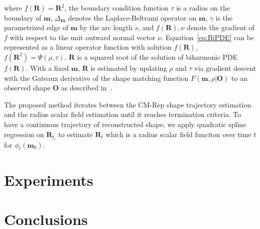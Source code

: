\documentclass[runningheads,a4paper]{llncs}
\begin{document}
where $f(\mathbf{R}) = \mathbf{R}^2$, the boundary condition function $\tau$ is a radius on the boundary of $\mathbf{m}$, $\Delta_{\mathbf{m}}$ denotes the Laplace-Beltrami operator on $\mathbf{m}$, $\gamma$ is the parametrized edge of $\mathbf{m}$ by the arc length $s$, and $f(\mathbf{R}), \nu$ denots the gradient of $f$ with respect to the unit outward normal vector $\nu$. 
Equation~\ref{eq:BiPDE} can be represented as a linear operator function with solution $f(\mathbf{R})$, $f(\mathbf{R}^2) = \Psi( \rho, \tau)$.
$\mathbf{R}$ is a squared root of the solution of biharmonic PDE $f(\mathbf{R})$. 
With a fixed $\mathbf{m}$, $\mathbf{R}$ is estimated by updating $\rho$ and $\tau$ via gradient descent with the Gateaux derivative of the shape matching function $F( \mathbf{m}, \rho | \mathbf{O})$ to an observed shape $\mathbf{O}$ as described in~\cite{Yushkevich2006}.

The proposed method iterates between the CM-Rep shape trajectory estimation and the radius scalar field estimation until it reaches termination criteria. 
To have a continuous trajectory of reconstructed shape, we apply quadratic spline regression on $\mathbf{R}_{t_i}$ to estimate $\mathbf{R}_t$ which is a radius scalar field funciton over time $t$ for $\phi_t(\mathbf{m}_0)$. 

\section{Experiments}

\section{Conclusions}

\begin{comment}
In this study, we proposed a novel framework that makes use of subject-specific shape deformation trajectories by diffeomorphic shape regression models and the longitudinal statistical analysis.
Results show how the shape deformation has more significance than the volumetric analysis and how significantly it correlates with continuous CAP score for a global shape and local subregions. 
The global shape analysis showed that the gradient magnitude of deformation vectors over global shape has better significance than volume-wise metric regardless of different baseline shapes of different subjects.
The local shape analysis also revealed statistically significant general trends of subregion shape changes. 
As a future direction, the analysis will also be extended to develop an HD progression model that will allow prediction of the stage of disease of individuals based on shape biomarkers.
\end{comment}



\end{document}
